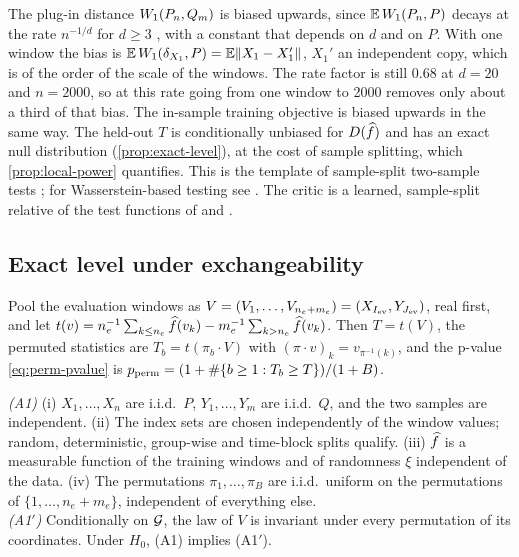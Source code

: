 \begin{remark}\label{rem:holdout}
The plug-in distance $W_{1}(P_n,Q_m)$ is biased upwards, since $\mathbb{E}\,W_{1}(P_n,P)$ decays at the rate
$n^{-1/d}$ for $d\ge3$ \citep{fournier2015rate}, with a constant that depends on $d$ and on $P$. With
one window the bias is $\mathbb{E}\,W_{1}(\delta_{X_1},P)=\mathbb{E}\lVert X_1-X_1'\rVert$, $X_1'$ an independent copy, which
is of the order of the scale of the windows. The rate factor is still $0.68$ at $d=20$ and
$n=2000$, so at this rate going from one window to 2000 removes only about a third of that bias.
The in-sample training objective is biased upwards in the same way. The
held-out $T$ is conditionally unbiased for $D(\widehat{f})$ and has an exact null distribution
(\cref{prop:exact-level}), at the cost of sample splitting, which \cref{prop:local-power}
quantifies. This is the template of sample-split two-sample tests
\citep{lopezpaz2017revisiting,kim2021classification,liu2020learning,kubler2022witness}; for
Wasserstein-based testing see \citet{ramdas2017wasserstein}. The critic is a learned, sample-split
relative of the test functions of \citet{bierens1990consistent} and
\citet{stinchcombe1998consistent}.
\end{remark}

\subsection{Exact level under exchangeability}\label{sec:theory-level}

Pool the evaluation windows as $V=(V_1,\dots,V_{n_e+m_e})=(X_{I_{\mathrm{ev}}},Y_{J_{\mathrm{ev}}})$, real first, and let
$t(v)=n_e^{-1}\sum_{k\le n_e}\widehat{f}(v_k)-m_e^{-1}\sum_{k>n_e}\widehat{f}(v_k)$. Then $T=t(V)$, the
permuted statistics are $T_b=t(\pi_b\cdot V)$ with $(\pi\cdot v)_k=v_{\pi^{-1}(k)}$, and the
p-value \eqref{eq:perm-pvalue} is $p_{\mathrm{perm}}=(1+\#\{b\ge1:T_b\ge T\})/(1+B)$.

\begin{assumption}[Exchangeability]\label{ass:exch}
\emph{(A1)} (i) $X_1,\dots,X_n$ are i.i.d.\ $P$, $Y_1,\dots,Y_m$ are i.i.d.\ $Q$, and the two
samples are independent. (ii) The index sets are chosen independently of the window values;
random, deterministic, group-wise and time-block splits qualify. (iii) $\widehat{f}$ is a measurable
function of the training windows and of randomness $\xi$ independent of the data. (iv) The
permutations $\pi_1,\dots,\pi_B$ are i.i.d.\ uniform on the permutations of $\{1,\dots,n_e+m_e\}$,
independent of everything else.\\
\emph{(A1$'$)} Conditionally on $\mathcal{G}$, the law of $V$ is invariant under every permutation of
its coordinates. Under $H_0$, (A1) implies (A1$'$).
\end{assumption}

